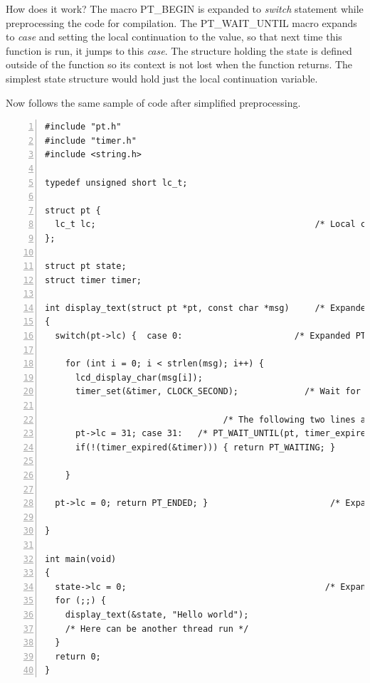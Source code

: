 How does it work? The macro PT\_BEGIN is expanded to {\it switch} statement while preprocessing the
code for compilation.
The PT\_WAIT\_UNTIL macro expands to {\it case} and setting the local continuation
to the value, so that next time this function is run, it jumps to this {\it case}.
The structure holding the state is defined outside of the function so its context is not lost when
the function returns. The simplest state structure would hold just the local continuation variable.

Now follows
the same sample of code after simplified preprocessing.
\begin{lstlisting}[numbers=left]
#include "pt.h"
#include "timer.h"
#include <string.h>

typedef unsigned short lc_t;

struct pt {
  lc_t lc;                                           /* Local continuation */
}; 

struct pt state;
struct timer timer;

int display_text(struct pt *pt, const char *msg)     /* Expanded PT_THREAD */
{
  switch(pt->lc) {  case 0:                      /* Expanded PT_BEGIN(pt); */
  
    for (int i = 0; i < strlen(msg); i++) {
      lcd_display_char(msg[i]);
      timer_set(&timer, CLOCK_SECOND);             /* Wait for one second. */
    
                                   /* The following two lines are expanded */
      pt->lc = 31; case 31:   /* PT_WAIT_UNTIL(pt, timer_expired(&timer)); */
      if(!(timer_expired(&timer))) { return PT_WAITING; }         /* macro */
    
    }
  
  pt->lc = 0; return PT_ENDED; }                        /* Expanded PT_END */
  
}

int main(void)
{
  state->lc = 0;                                       /* Expanded PT_INIT */
  for (;;) {
    display_text(&state, "Hello world");
    /* Here can be another thread run */
  }
  return 0;
}

\end{lstlisting}

